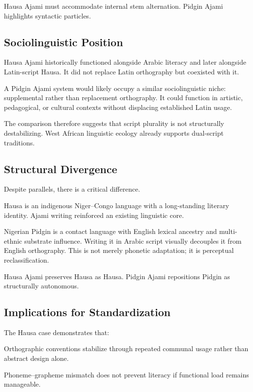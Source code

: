 \documentclass[12pt]{article}
\begin{document}
Hausa Ajami must accommodate internal stem alternation. Pidgin Ajami highlights syntactic particles.

\subsection{Sociolinguistic Position}

Hausa Ajami historically functioned alongside Arabic literacy and later alongside Latin-script Hausa. It did not replace Latin orthography but coexisted with it.

A Pidgin Ajami system would likely occupy a similar sociolinguistic niche: supplemental rather than replacement orthography. It could function in artistic, pedagogical, or cultural contexts without displacing established Latin usage.

The comparison therefore suggests that script plurality is not structurally destabilizing. West African linguistic ecology already supports dual-script traditions.

\subsection{Structural Divergence}

Despite parallels, there is a critical difference.

Hausa is an indigenous Niger–Congo language with a long-standing literary identity. Ajami writing reinforced an existing linguistic core.

Nigerian Pidgin is a contact language with English lexical ancestry and multi-ethnic substrate influence. Writing it in Arabic script visually decouples it from English orthography. This is not merely phonetic adaptation; it is perceptual reclassification.

Hausa Ajami preserves Hausa as Hausa. Pidgin Ajami repositions Pidgin as structurally autonomous.

\subsection{Implications for Standardization}

The Hausa case demonstrates that:

Orthographic conventions stabilize through repeated communal usage rather than abstract design alone.

Phoneme–grapheme mismatch does not prevent literacy if functional load remains manageable.
\end{document}
